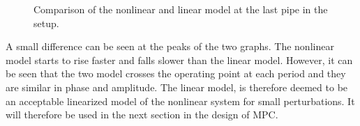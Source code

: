 \begin{figure}[H]
\centering

\caption{Comparison of the nonlinear and linear model at the last pipe in the setup.}
\label{fig:linear_nonlinear_comparison_last_pipe}
\end{figure}

A small difference can be seen at the peaks of the two graphs. The nonlinear model starts to rise faster and falls slower than the linear model. However, it can be seen that the two model crosses the operating point at each period and they are similar in phase and amplitude. The linear model, is therefore deemed to be an acceptable linearized model of the nonlinear system for small perturbations. It will therefore be used in the next section in the design of MPC. 